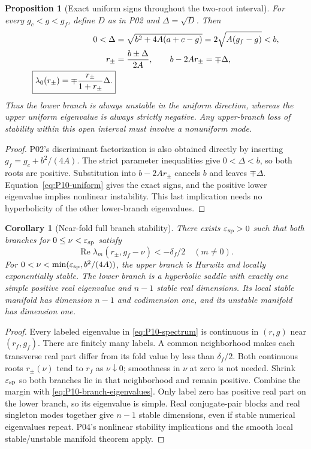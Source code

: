 \documentclass[11pt]{article}
\DeclareMathOperator{\Ree}{Re}
\newtheorem{proposition}[theorem]{Proposition}
\newtheorem{corollary}[theorem]{Corollary}
\theoremstyle{definition}
\theoremstyle{remark}
\begin{document}
\begin{proposition}[Exact uniform signs throughout the two-root interval]
\label{prop:P10-branch-signs}
For every $g_c<g<g_f$, define $D$ as in P02 and $\Delta=\sqrt D$.
Then
\begin{align}
 0<\Delta&=\sqrt{b^2+4A(a+c-g)}=2\sqrt{A(g_f-g)}<b,\notag\\
 r_\pm&=\frac{b\pm\Delta}{2A},\qquad
 b-2Ar_\pm=\mp\Delta,\label{eq:P10-discriminant}\\
 \boxed{\lambda_0(r_\pm)=\mp\frac{r_\pm}{1+r_\pm}\Delta.}
 \label{eq:P10-branch-eigenvalues}
\end{align}
Thus the lower branch is always unstable in the uniform direction,
whereas the upper uniform eigenvalue is always strictly negative.
Any upper-branch loss of stability within this open interval must
involve a nonuniform mode.
\end{proposition}
\begin{proof}
P02's discriminant factorization is also obtained directly by inserting
$g_f=g_c+b^2/(4A)$. The strict parameter inequalities give $0<\Delta<b$,
so both roots are positive. Substitution into $b-2Ar_\pm$ cancels
$b$ and leaves $\mp\Delta$. Equation~\eqref{eq:P10-uniform}
gives the exact signs, and the positive lower eigenvalue implies
nonlinear instability. This last implication needs no hyperbolicity
of the other lower-branch eigenvalues.
\end{proof}

\begin{corollary}[Near-fold full branch stability]
\label{cor:P10-near-stability}
There exists $\varepsilon_{\rm sp}>0$ such that both branches for
$0\le\nu<\varepsilon_{\rm sp}$ satisfy
\[
 \Ree\lambda_m(r_\pm,g_f-\nu)<-\delta_f/2\quad(m\ne0).
\]
For $0<\nu<\min(\varepsilon_{\rm sp},b^2/(4A))$, the upper
branch is Hurwitz and locally exponentially stable. The lower branch
is a hyperbolic saddle with exactly one simple positive real eigenvalue
and $n-1$ stable real dimensions. Its local stable manifold has dimension
$n-1$ and codimension one, and its unstable manifold has dimension one.
\end{corollary}
\begin{proof}
Every labeled eigenvalue in \eqref{eq:P10-spectrum} is continuous
in $(r,g)$ near $(r_f,g_f)$. There are finitely many labels.
A common neighborhood makes each transverse real part differ from
its fold value by less than $\delta_f/2$. Both continuous roots
$r_\pm(\nu)$ tend to $r_f$ as $\nu\downarrow0$; smoothness in
$\nu$ at zero is not needed. Shrink $\varepsilon_{\rm sp}$ so both
branches lie in that neighborhood and remain positive. Combine the
margin with \eqref{eq:P10-branch-eigenvalues}. Only label zero has
positive real part on the lower branch, so its eigenvalue is simple.
Real conjugate-pair blocks and real singleton modes together give
$n-1$ stable dimensions, even if stable numerical eigenvalues repeat.
P04's nonlinear stability implications and the smooth local
stable/unstable manifold theorem apply.
\end{proof}
\end{document}
